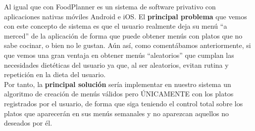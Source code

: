\documentclass[12pt, a4paper, twoside]{book}
\begin{document}
	Al igual que con FoodPlanner es un sistema de software privativo con aplicaciones nativas móviles Android e iOS.
	El \textbf{principal problema} que vemos con este concepto de sistema es que el usuario realmente deja su menú ``a merced'' de la aplicación de forma que puede obtener menús con platos que no sabe cocinar, o bien no le gustan. Aún así, como comentábamos anteriormente, si que vemos una gran ventaja en obtener menús ``aleatorios'' que cumplan las necesidades dietéticas del usuario ya que, al ser aleatorios, evitan rutina y repetición en la dieta del usuario.\\
	Por tanto, la \textbf{principal solución} sería implementar en nuestro sistema un algoritmo de creación de menús válidos pero ÚNICAMENTE con los platos registrados por el usuario, de forma que siga teniendo el control total sobre los platos que aparecerán en sus menús semanales y no aparezcan aquellos no deseados por él.
\end{document}
